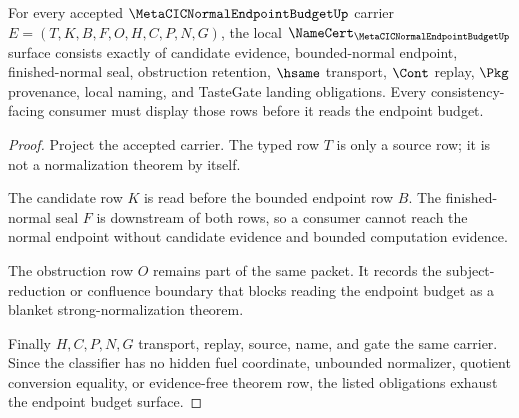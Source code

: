 \begin{theorem}
\label{thm:metacic-normal-endpoint-budget-namecert-obligations}
For every accepted $\MetaCICNormalEndpointBudgetUp$ carrier $E=(T,K,B,F,O,H,C,P,N,G)$, the local $\NameCert_{\MetaCICNormalEndpointBudgetUp}$ surface consists exactly of candidate evidence, bounded-normal endpoint, finished-normal seal, obstruction retention, $\hsame$ transport, $\Cont$ replay, $\Pkg$ provenance, local naming, and TasteGate landing obligations. Every consistency-facing consumer must display those rows before it reads the endpoint budget.
\end{theorem}
\begin{proof}
Project the accepted carrier. The typed row $T$ is only a source row; it is not a normalization theorem by itself.

The candidate row $K$ is read before the bounded endpoint row $B$. The finished-normal seal $F$ is downstream of both rows, so a consumer cannot reach the normal endpoint without candidate evidence and bounded computation evidence.

The obstruction row $O$ remains part of the same packet. It records the subject-reduction or confluence boundary that blocks reading the endpoint budget as a blanket strong-normalization theorem.

Finally $H,C,P,N,G$ transport, replay, source, name, and gate the same carrier. Since the classifier has no hidden fuel coordinate, unbounded normalizer, quotient conversion equality, or evidence-free theorem row, the listed obligations exhaust the endpoint budget surface.
\end{proof}

